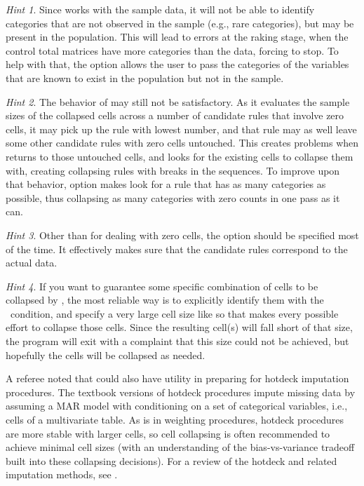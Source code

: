 \textit{Hint 1}. Since  works with the sample data,
it will not be able to identify categories that are not observed in the sample (e.g., rare categories),
but may be present in the population. This will lead to errors at the raking stage,
when the control total matrices have more categories than the data, forcing  to stop.
To help with that, the option  allows the user to pass the categories
of the variables that are known to exist in the population but not in the sample.

\textit{Hint 2}. The behavior of  may still not be
satisfactory. As it evaluates the sample sizes of the collapsed cells across a number
of candidate rules that involve zero cells, it may pick up the rule with lowest
number, and that rule may as well leave some other candidate rules with zero cells untouched.
This creates problems when  returns to those untouched cells,
and looks for the existing cells to collapse them with, creating collapsing rules with breaks
in the sequences. To improve upon that behavior, option  makes
 look for a rule that has as many categories as possible, thus collapsing
as many categories with zero counts in one pass as it can.

\textit{Hint 3}. Other than for dealing with zero cells, the option  should be specified
most of the time. It effectively makes sure that the candidate rules correspond to the actual data.

\textit{Hint 4}. 
If you want to guarantee some specific combination of cells to be collapsed by ,
the most reliable way is to explicitly identify them with the \ifexp\ condition, and specify 
a very large cell size like  so that  makes every possible
effort to collapse those cells. Since the resulting cell(s) will fall short of that size, the program will exit 
with a complaint that this size could not be achieved,
but hopefully the cells will be collapsed as needed.

\bigskip

A referee noted that  could also have utility in preparing for hotdeck imputation procedures.
The textbook versions of hotdeck procedures impute missing data by assuming a MAR model \citep{rubin:mar:1976} 
with conditioning on a set of categorical variables, i.e., cells of a multivariate table. As is in weighting procedures,
hotdeck procedures are more stable with larger cells, so cell collapsing is often recommended to achieve
minimal cell sizes (with an understanding of the bias-vs-variance tradeoff built into these collapsing decisions).
For a review of the hotdeck and related imputation methods, see \citet{andridge:2016}.

